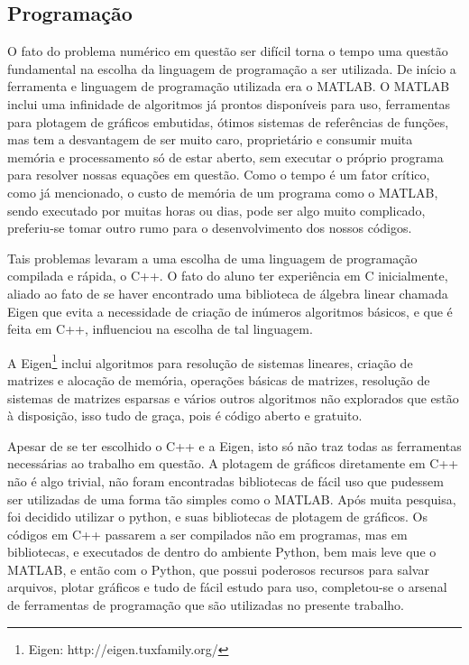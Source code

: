 \documentclass[journal]{IEEEtran}
\begin{document}
\subsection{Programação}
O fato do problema numérico em questão ser difícil torna o tempo uma questão fundamental na escolha da linguagem de programação a ser utilizada. De início a ferramenta e linguagem de programação utilizada era o MATLAB\textregistered. O MATLAB inclui uma infinidade de algoritmos já prontos disponíveis para uso, ferramentas para plotagem de gráficos embutidas, ótimos sistemas de referências de funções, mas tem a desvantagem de ser muito caro, proprietário e consumir muita memória e processamento só de estar aberto, sem executar o próprio programa para resolver nossas equações em questão. Como o tempo é um fator crítico, como já mencionado, o custo de memória de um programa como o MATLAB, sendo executado por muitas horas ou dias, pode ser algo muito complicado, preferiu-se tomar outro rumo para o desenvolvimento dos nossos códigos.

Tais problemas levaram a uma escolha de uma linguagem de programação compilada e rápida, o C++. O fato do aluno ter experiência em C inicialmente, aliado ao fato de se haver encontrado uma biblioteca de álgebra linear chamada Eigen que evita a necessidade de criação de inúmeros algoritmos básicos, e que é feita em C++, influenciou na escolha de tal linguagem.

A Eigen\footnote{Eigen: http://eigen.tuxfamily.org/} inclui algoritmos para resolução de sistemas lineares, criação de matrizes e alocação de memória, operações básicas de matrizes, resolução de sistemas de matrizes esparsas e vários outros algoritmos não explorados que estão à disposição, isso tudo de graça, pois é código aberto e gratuito. 

Apesar de se ter escolhido o C++ e a Eigen, isto só não traz todas as ferramentas necessárias ao trabalho em questão. A plotagem de gráficos diretamente em C++ não é algo trivial, não foram encontradas bibliotecas de fácil uso que pudessem ser utilizadas de uma forma tão simples como o MATLAB. Após muita pesquisa, foi decidido utilizar o python, e suas bibliotecas de plotagem de gráficos. Os códigos em C++ passarem a ser compilados não em programas, mas em bibliotecas, e executados de dentro do ambiente Python, bem mais leve que o MATLAB, e então com o Python, que possui poderosos recursos para salvar arquivos, plotar gráficos e tudo de fácil estudo para uso, completou-se o arsenal de ferramentas de programação que são utilizadas no presente trabalho.
\end{document}
